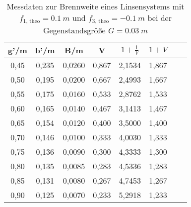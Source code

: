 \begin{table}[h!]
  \centering
  \caption{Messdaten zur Brennweite eines Linsensystems mit $f_{\text{1, theo}}=\SI{0.1}{m}$ und $f_{\text{3, theo}}=\SI{-0.1}{m}$ bei der Gegenstandsgröße $G=\SI{0.03}{m}$}
  \label{tab:abbe}
  \begin{tabular}{c c c c c c c c}
    \toprule
      g'/m  &  b'/m   &  B/m     &  V      &  $1+\frac{1}{V}$ &  $1+V$  \\
      \midrule
      0,45  &  0,235  &  0,0260  &  0,867  &  2,1534          &  1,867  \\
      0,50  &  0,195  &  0,0200  &  0,667  &  2,4993          &  1,667  \\
      0,55  &  0,175  &  0,0160  &  0,533  &  2,8762          &  1,533  \\
      0,60  &  0,165  &  0,0140  &  0,467  &  3,1413          &  1,467  \\
      0,65  &  0,154  &  0,0120  &  0,400  &  3,5000          &  1,400  \\
      0,70  &  0,146  &  0,0100  &  0,333  &  4,0030          &  1,333  \\
      0,75  &  0,136  &  0,0090  &  0,300  &  4,3333          &  1,300  \\
      0,80  &  0,135  &  0,0085  &  0,283  &  4,5336          &  1,283  \\
      0,85  &  0,131  &  0,0080  &  0,267  &  4,7453          &  1,267  \\
      0,90  &  0,125  &  0,0070  &  0,233  &  5,2918          &  1,233  \\
    \bottomrule
  \end{tabular}
\end{table}

%
